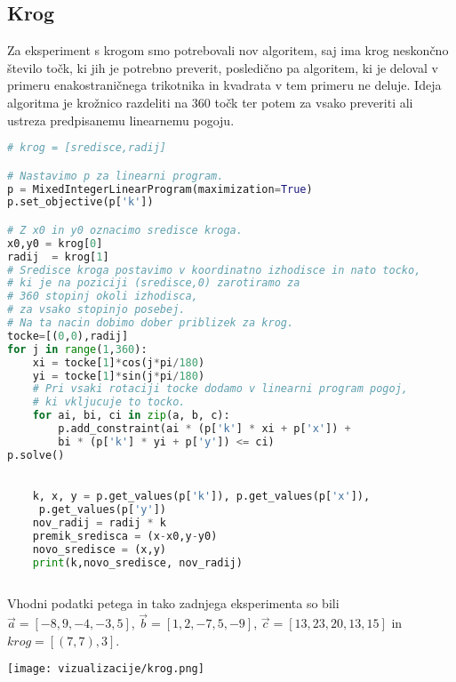 \documentclass[a4paper, 12pt]{article}
\begin{document}
\subsection{Krog}
Za eksperiment s krogom smo potrebovali nov algoritem, saj ima krog neskončno število točk, ki jih je potrebno preverit,
posledično pa algoritem, ki je 
deloval v primeru enakostraničnega trikotnika in kvadrata v tem primeru ne deluje. Ideja algoritma je krožnico razdeliti na $360$ točk ter potem za vsako
preveriti ali ustreza predpisanemu linearnemu pogoju. 
\begin{lstlisting}[language=Python]
# krog = [sredisce,radij]

# Nastavimo p za linearni program.
p = MixedIntegerLinearProgram(maximization=True)
p.set_objective(p['k'])

# Z x0 in y0 oznacimo sredisce kroga.
x0,y0 = krog[0]
radij  = krog[1]
# Sredisce kroga postavimo v koordinatno izhodisce in nato tocko,
# ki je na poziciji (sredisce,0) zarotiramo za
# 360 stopinj okoli izhodisca,
# za vsako stopinjo posebej.
# Na ta nacin dobimo dober priblizek za krog.
tocke=[(0,0),radij]
for j in range(1,360):
    xi = tocke[1]*cos(j*pi/180)
    yi = tocke[1]*sin(j*pi/180)
    # Pri vsaki rotaciji tocke dodamo v linearni program pogoj,
    # ki vkljucuje to tocko.
    for ai, bi, ci in zip(a, b, c):
        p.add_constraint(ai * (p['k'] * xi + p['x']) + 
        bi * (p['k'] * yi + p['y']) <= ci)
p.solve()
    

    k, x, y = p.get_values(p['k']), p.get_values(p['x']),
     p.get_values(p['y'])
    nov_radij = radij * k
    premik_sredisca = (x-x0,y-y0)
    novo_sredisce = (x,y)
    print(k,novo_sredisce, nov_radij)
    
\end{lstlisting}
Vhodni podatki petega in tako zadnjega eksperimenta so bili $\vec{a}=[-8,9,-4,-3,5]$, $\vec{b}=[1,2,-7,5,-9]$, $\vec{c}=[13,23,20,13,15]$ in $krog=[(7,7),3]$.
\begin{center}
    \texttt{[image: vizualizacije/krog.png]}\\
\end{center}
\end{document}
